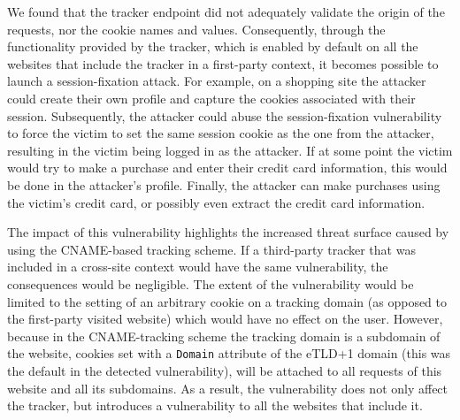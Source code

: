 We found that the tracker endpoint did not adequately validate the origin of the requests, nor the cookie names and values.
Consequently, through the functionality provided by the tracker, which is enabled by default on all the websites that include the tracker in a first-party context, it becomes possible to launch a session-fixation attack.
For example, on a shopping site the attacker could create their own profile and capture the cookies associated with their session.
Subsequently, the attacker could abuse the session-fixation vulnerability to force the victim to set the same session cookie as the one from the attacker, resulting in the victim being logged in as the attacker.
If at some point the victim would try to make a purchase and enter their credit card information, this would be done in the attacker's profile.
Finally, the attacker can make purchases using the victim's credit card, or possibly even extract the credit card information.



The impact of this vulnerability highlights the increased threat surface caused by using the CNAME-based tracking scheme.
If a third-party tracker that was included in a cross-site context would have the same vulnerability, the consequences would be negligible.
The extent of the vulnerability would be limited to the setting of an arbitrary cookie on a tracking domain (as opposed to the first-party visited website) which would have no effect on the user.
However, because in the CNAME-tracking scheme the tracking domain is a subdomain of the website, cookies set with a \texttt{Domain} attribute of the eTLD+1 domain (this was the default in the detected vulnerability), will be attached to all requests of this website and all its subdomains.
As a result, the vulnerability does not only affect the tracker, but introduces a vulnerability to all the websites that include it.


